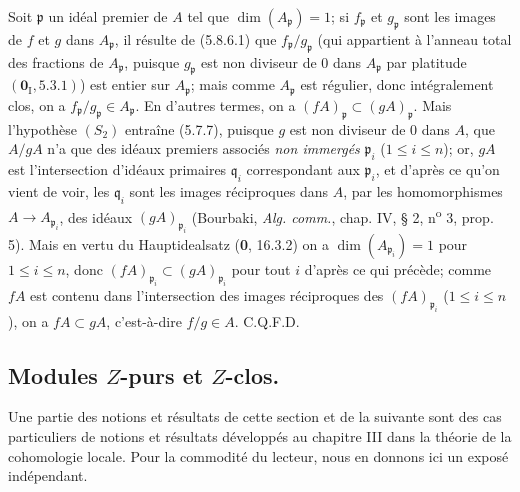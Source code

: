 Soit $\mathfrak p$ un idéal premier de $A$ tel que
$\dim(A_{\mathfrak p})=1$; si $f_{\mathfrak p}$ et $g_{\mathfrak p}$ sont
les images de $f$ et $g$ dans $A_{\mathfrak p}$, il résulte de (5.8.6.1) que
$f_{\mathfrak p}/g_{\mathfrak p}$ (qui appartient à l'anneau total des
fractions de $A_{\mathfrak p}$, puisque $g_{\mathfrak p}$ est non diviseur
de 0 dans $A_{\mathfrak p}$ par platitude $(\mathbf{0}_{\mathrm I},5.3.1)$) est entier
sur $A_{\mathfrak p}$; mais comme $A_{\mathfrak p}$ est régulier, donc
intégralement clos, on a $f_{\mathfrak p}/g_{\mathfrak p}\in A_{\mathfrak p}$.
En d'autres termes, on a
$(fA)_{\mathfrak p}\subset(gA)_{\mathfrak p}$. Mais l'hypothèse $(S_2)$
entraîne (5.7.7), puisque $g$ est non diviseur de 0 dans $A$, que $A/gA$
n'a que des idéaux premiers associés \emph{non immergés} $\mathfrak p_i$
($1\leq i\leq n$); or, $gA$ est l'intersection d'idéaux primaires
$\mathfrak q_i$ correspondant aux $\mathfrak p_i$, et d'après ce qu'on vient
de voir, les $\mathfrak q_i$ sont les images réciproques dans $A$, par les
homomorphismes $A\to A_{\mathfrak p_i}$, des idéaux
$(gA)_{\mathfrak p_i}$ (Bourbaki, \emph{Alg. comm.}, chap. IV, § 2, n\textsuperscript{o} 3,
prop. 5). Mais en vertu du Hauptidealsatz (\textbf{0}, 16.3.2) on a
$\dim(A_{\mathfrak p_i})=1$ pour $1\leq i\leq n$, donc
$(fA)_{\mathfrak p_i}\subset(gA)_{\mathfrak p_i}$ pour tout $i$ d'après ce
qui précède; comme $fA$ est contenu dans l'intersection des images
réciproques des $(fA)_{\mathfrak p_i}$ ($1\leq i\leq n$), on a
$fA\subset gA$, c'est-à-dire $f/g\in A$. C.Q.F.D.


\subsection{\texorpdfstring{Modules $Z$-purs et $Z$-clos.}{Modules Z-purs et Z-clos}}

Une partie des notions et résultats de cette section et de la suivante sont des
cas particuliers de notions et résultats développés au chapitre III dans la
théorie de la cohomologie locale. Pour la commodité du lecteur, nous en donnons
ici un exposé indépendant.

